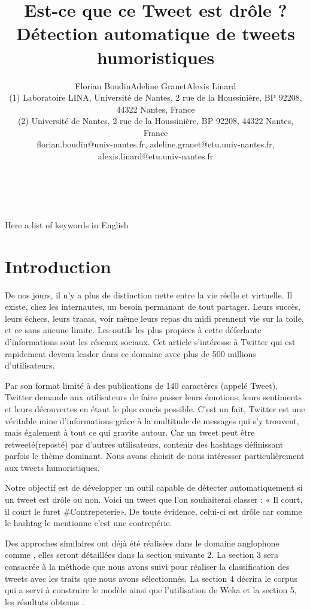 \documentclass[10pt,a4paper,twoside]{article}
\title{Est-ce que ce Tweet est drôle ? Détection automatique de tweets humoristiques}
\author{Florian Boudin\up{1}\quad Adeline Granet\up{2}\quad Alexis Linard\up{2}\\
  (1) Laboratoire LINA, Université de Nantes, 2 rue de la Houssinière, BP 92208, 44322 Nantes, France \\ 
  (2) Université de Nantes, 2 rue de la Houssinière, BP 92208, 44322 Nantes, France\\ 
  florian.boudin@univ-nantes.fr, adeline.granet@etu.univ-nantes.fr, alexis.linard@etu.univ-nantes.fr \\ 
}
\begin{document}
\maketitle


\\

\\

{Here a list of keywords in English}


\section{Introduction}


De nos jours, il n’y a plus de distinction nette entre la vie réelle et virtuelle. Il existe, chez les internautes, un besoin permanant de tout partager. Leurs succès, leurs échecs, leurs tracas, voir même leurs repas du midi prennent vie sur la toile, et ce sans aucune limite. Les outils les plus propices à cette déferlante d’informations sont les réseaux sociaux. Cet article s'intéresse à Twitter qui est rapidement devenu leader dans ce domaine avec plus de 500 millions d’utilisateurs.

Par son format limité à des publications de 140 caractères (appelé Tweet), Twitter demande aux utilisateurs de faire passer leurs émotions, leurs sentiments et leurs découvertes en étant le plus concis possible. C’est un fait, Twitter est une véritable mine d’informations grâce à la multitude de messages qui s'y trouvent, mais également à tout ce qui gravite autour. Car un tweet peut être retweeté(reposté) par d'autres utilisateurs, contenir des hashtags définissant parfois le thème dominant.  Nous avons choisit de nous intéresser particulièrement aux tweets humoristiques.

Notre objectif est de développer un outil capable de détecter automatiquement si un tweet est drôle ou non. Voici un tweet que l’on souhaiterai classer : « Il court, il court le furet \#Contrepeterie».  De toute évidence, celui-ci est drôle car comme le hashtag le mentionne c’est une contrepérie. 

Des approches similaires ont déjà été réalisées dans le domaine anglophone comme \cite{Raz12, Barbosa2010}, elles seront détaillées dans la section suivante 2. La section 3 sera consacrée à la méthode que nous avons suivi pour réaliser la classification des tweets avec les traits que nous avons sélectionnés. La section 4 décrira le corpus qui a servi à construire le modèle ainsi que l’utilisation de Weka et la section 5, les résultats obtenus .
\end{document}

